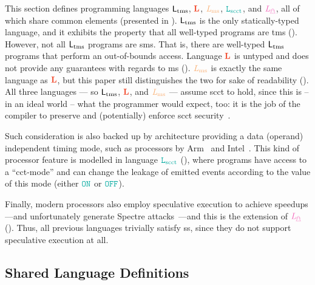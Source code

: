 \documentclass[acmsmall]{acmart}
\theoremstyle{definition}
\begin{document}
This section defines programming languages $\mathsf{L_{\operatorname{tms}}}$, $\Ltrg$, $\Lms$, $\Lscct$, and $\Lspec$, all of which share common elements (presented in ).
$\mathsf{L_{\operatorname{tms}}}$ is the only statically-typed language, and it exhibits the property that all well-typed programs are \gls*{tms} ().
However, not all $\mathsf{L_{\operatorname{tms}}}$ programs are \gls*{sms}.
That is, there are well-typed $\mathsf{L_{\operatorname{tms}}}$ programs that perform an out-of-bounds access.
Language $\Ltrg$ is untyped and does not provide any guarantees with regards to \gls*{ms} ().
$\Lms$ is exactly the same language as $\Ltrg$, but this paper still distinguishes the two for sake of readability ().
All three languages --- so $\mathsf{L_{\operatorname{tms}}}$, $\Ltrg$, and $\Lms$ --- assume \gls*{scct} to hold, since this is -- in an ideal world -- what the programmer would expect, too: it is the job of the compiler to preserve and (potentially) enforce \gls*{scct} security~\cite{cauligi2019fact,nagarakatte2010cets,nagarakatte2009soft,akritidis2009baggy}.

Such consideration is also backed up by architecture providing a data (operand) independent timing mode, such as processors by Arm~\cite[p.~543]{arm-refman} and Intel~\cite[p.~80]{intel-refman}.
This kind of processor feature is modelled in language $\Lscct$ (), where programs have access to a ``\gls*{cct}-mode'' and can change the leakage of emitted events according to the value of this mode (either $\obj{ON}$ or $\obj{OFF}$). 

Finally, modern processors also employ speculative execution to achieve speedups---and unfortunately generate Spectre attacks~\cite{kocher2019spectre}---and this is the extension of $\Lspec$ ().
%
Thus, all previous languages trivially satisfy \gls*{ss}, since they do not support speculative execution at all.

\subsection{Shared Language Definitions}\label{subsec:cs:defs}
\end{document}
